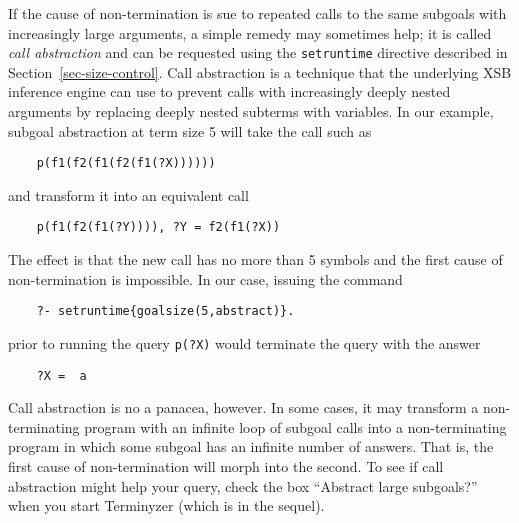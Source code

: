 If the cause of non-termination is sue to repeated calls to the same
subgoals with increasingly large arguments, a simple remedy may sometimes
help; it is called \emph{call abstraction}   and can be requested using the
\texttt{setruntime} directive described in Section~\ref{sec-size-control}. 
Call abstraction is a technique that the underlying XSB inference engine
can use to prevent calls with increasingly deeply nested arguments by
replacing deeply nested subterms with variables. In our example, subgoal
abstraction at term size 5 will take the call
such as
\begin{verbatim}
    p(f1(f2(f1(f2(f1(?X))))))
\end{verbatim}
and transform it into an equivalent call
\begin{verbatim}
    p(f1(f2(f1(?Y)))), ?Y = f2(f1(?X))
\end{verbatim}
The effect is that the new call has no more than 5 symbols and the first
cause of non-termination is impossible. In our case, issuing the command
\begin{verbatim}
    ?- setruntime{goalsize(5,abstract)}.
\end{verbatim}
prior to running the query \texttt{p(?X)} would terminate the query with
the answer 
\begin{verbatim}
    ?X =  a
\end{verbatim}
Call abstraction is no a panacea, however. In some cases, it may transform a
non-terminating program with an infinite loop of subgoal calls into a
non-terminating program in which some subgoal has an infinite number of
answers. That is, the first cause of non-termination will morph into the
second. To see if call abstraction might help your query, check the box
``Abstract large subgoals?'' when you start Terminyzer (which is in the
sequel).


